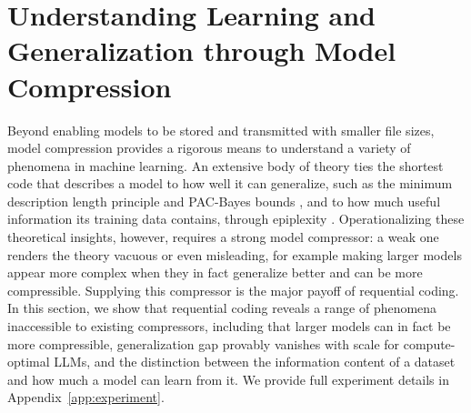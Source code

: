 \documentclass{article}
\theoremstyle{plain}
\theoremstyle{definition}
\theoremstyle{remark}
\begin{document}
%
%
%
%

%
%




%
%
%
%
%
%


%
%
%
%
%
%
%
%
%
%
%
%
%
%




%

%
%
%
%
%
%
%
%
%
%



%
%
%
%
%
%
%
%
%
%


%


%

%




%

%


%





%

%


%
%

%




%
%


%
%





%
%
%
%

%
\section{Understanding Learning and Generalization through Model Compression}
\label{sec:findings}
Beyond enabling models to be stored and transmitted with smaller file sizes, model compression provides a rigorous means to understand a variety of phenomena in machine learning. An extensive body of theory ties the shortest code that describes a model to how well it can generalize, such as the minimum description length principle \citep{rissanen1978modeling, grunwald2007minimum} and PAC-Bayes bounds \citep{shalev2014understanding,zhou2018non,lotfi2022pac,lotfi2023non}, and to how much useful information its training data contains, through epiplexity \citep{finzi2026entropy}. Operationalizing these theoretical insights, however, requires a strong model compressor: a weak one renders the theory vacuous or even misleading, for example making larger models appear more complex when they in fact generalize better and can be more compressible. Supplying this compressor is the major payoff of requential coding. In this section, we show that requential coding reveals a range of phenomena inaccessible to existing compressors, including that larger models can in fact be more compressible, generalization gap provably vanishes with scale for compute-optimal LLMs, and the distinction between the information content of a dataset and how much a model can learn from it. We provide full experiment details in Appendix~\ref{app:experiment}.
%
%
\end{document}
